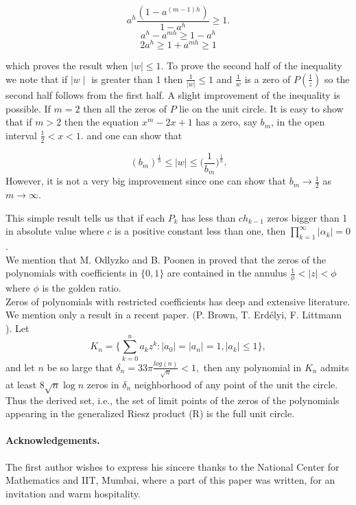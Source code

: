 \documentclass{amsart}
\theoremstyle{definition}
\theoremstyle{remark}
\numberwithin{equation}{section}
\newcommand{\1}{\mathbb{1}}
\begin{document}
$$a^h\frac{(1- a^{(m-1)h})}{1 - a^h} \geq 1. $$
$$a^h - a^{mh} \geq 1 - a^h$$
$$2a^h \geq 1 + a^{mh} \geq 1$$

which proves the result when $| w| \leq 1$. To prove the second half of the inequality we note that
if $\mid w \mid$ is greater than 1 then $\frac{1}{| w|} \leq 1$ and $\frac{1}{w}$ is a zero of $P(\frac{1}{z})$ so the second half follows from the first half. A slight improvement of the inequality is possible. If $m =2$ then all the zeros of $P$ lie on the unit circle. It is easy to show that if $m >2$ then the equation $x^m - 2x +1$ has a zero, say $b_m$, in the open interval $\frac{1}{2} < x < 1$. and one can show that

$$(b_m)^{\frac{1}{h}} \leq \mid w\mid  \leq \Big(\frac{1}{b_m}\Big)^{\frac{1}{h}}.$$
However, it is not a very big improvement since one can show that $b_m\rightarrow \frac{1}{2}$ as $m\rightarrow \infty$.

This simple result tells us that if each $P_k$ has less than $ch_{k-1}$ zeros bigger than 1 in absolute value
where $c$ is a positive constant less than one, then $\prod_{k=1}^\infty | \alpha_k| = 0$.\\

 We mention that M. Odlyzko and B. Poonen in \cite{Odlyzko} proved that the zeros of the polynomials with coefficients in $\{0,1\}$ are contained in the annulus $\frac1{\phi}<|z|<\phi$ where $\phi$ is the golden ratio.\\

Zeros of polynomials with restricted coefficients has deep and extensive literature. We mention only a result in a recent paper. (P. Brown, T. Erd\'elyi, F. Littmann \cite{BEL}). Let
$$K_n = \Biggl\{\sum_{k=0}^na_kz^k: \mid a_0\mid = \mid a_n\mid =1, \mid a_k\mid \leq 1\Biggr\},$$
and let $n$ be so large that $\delta_n = 33\pi\frac{log(n)}{\sqrt{n}} < 1,$
then any polynomial in $K_n$ admits at least $8\sqrt n \log n$ zeros in $\delta_n$ neighborhood of any point  of the unit the circle. Thus the derived set, i.e., the set of limit points of the zeros of the polynomials appearing in the generalized Riesz product (R) is the full unit circle.\\






 \paragraph{\textbf{Acknowledgements.}} The first author wishes to express his sincere
 thanks to the National Center for Mathematics and IIT, Mumbai, where a part of this paper was written, for an invitation and warm hospitality.\\
\end{document}
